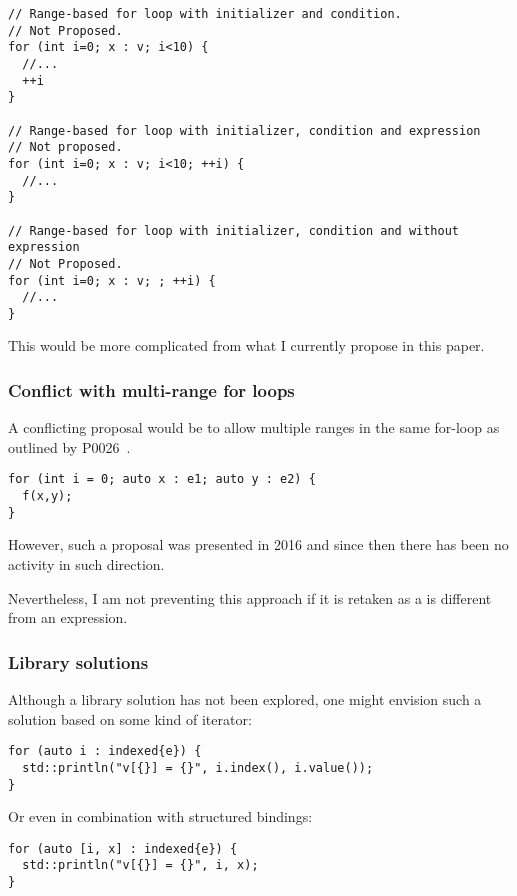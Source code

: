 \begin{lstlisting}
// Range-based for loop with initializer and condition.
// Not Proposed.
for (int i=0; x : v; i<10) {
  //...
  ++i
}

// Range-based for loop with initializer, condition and expression
// Not proposed.
for (int i=0; x : v; i<10; ++i) {
  //...
}

// Range-based for loop with initializer, condition and without expression
// Not Proposed.
for (int i=0; x : v; ; ++i) {
  //...
}
\end{lstlisting}

This would be more complicated from what I currently propose in this paper.

\subsubsection{Conflict with multi-range for loops}

A conflicting proposal would be to allow multiple ranges in the same for-loop as
outlined by P0026~\cite{p0026}. 

\begin{lstlisting}
for (int i = 0; auto x : e1; auto y : e2) {
  f(x,y);
}
\end{lstlisting}

However, such a proposal was presented in 2016
and since then there has been no activity in such direction.

Nevertheless, I am not preventing this approach if it is retaken as a
 is different from an expression.

\subsubsection{Library solutions}

Although a library solution has not been explored, one might envision such a
solution based on some kind of iterator:

\begin{lstlisting}
for (auto i : indexed{e}) {
  std::println("v[{}] = {}", i.index(), i.value());
}
\end{lstlisting}

Or even in combination with structured bindings:

\begin{lstlisting}
for (auto [i, x] : indexed{e}) {
  std::println("v[{}] = {}", i, x);
}
\end{lstlisting}

